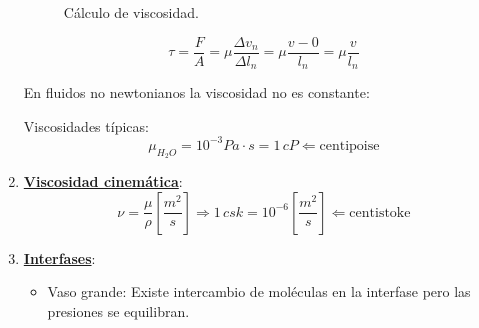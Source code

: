 \begin{enumerate}
\begin{figure}[!ht]
	\caption{Cálculo de viscosidad.}
	\label{fig:viscosidad}
\end{figure}

\[\tau =\frac{F}{A}=\mu \frac{\Delta v_n}{\Delta l_n} =\mu \frac{v - 0}{l_n}= \mu \frac{v}{l_n}\]
	 
	 En fluidos no newtonianos la viscosidad no es constante:
	 
	 \begin{center}
	 \end{center}
	 
	 Viscosidades típicas:
	 \[\mu_{H_2O}=10^{-3} Pa \cdot s = 1\,cP \Leftarrow \text{centipoise}\]
	\item \underline{\textbf{Viscosidad cinemática}}:
	\[\nu = \frac{\mu}{\rho} \left[\frac{m^2}{s}\right] \Rightarrow 1\,csk = 10^{-6}\left[\frac{m^2}{s}\right] \Leftarrow \text{centistoke}\]
	
	\item \underline{\textbf{Interfases}}: 
	\begin{itemize}
		\item Vaso grande: Existe intercambio de moléculas en la interfase pero las presiones se equilibran.


\end{itemize}
\end{enumerate}
